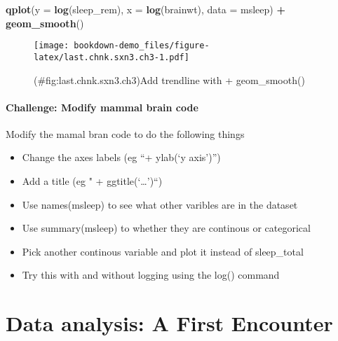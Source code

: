\documentclass[]{book}
\newenvironment{Shaded}{\begin{snugshade}}{\end{snugshade}}
\newcommand{\KeywordTok}[1]{\textcolor[rgb]{0.13,0.29,0.53}{\textbf{#1}}}
\newcommand{\DataTypeTok}[1]{\textcolor[rgb]{0.13,0.29,0.53}{#1}}
\newcommand{\StringTok}[1]{\textcolor[rgb]{0.31,0.60,0.02}{#1}}
\newcommand{\OperatorTok}[1]{\textcolor[rgb]{0.81,0.36,0.00}{\textbf{#1}}}
\newcommand{\NormalTok}[1]{#1}
\providecommand{\tightlist}{%
  \setlength{\itemsep}{0pt}\setlength{\parskip}{0pt}}
\theoremstyle{definition}
\theoremstyle{definition}
\theoremstyle{definition}
\theoremstyle{remark}
\begin{document}
\begin{Shaded}
\begin{Highlighting}[]
\KeywordTok{qplot}\NormalTok{(}\DataTypeTok{y =} \KeywordTok{log}\NormalTok{(sleep_rem),}
      \DataTypeTok{x =} \KeywordTok{log}\NormalTok{(brainwt), }
      \DataTypeTok{data =}\NormalTok{ msleep) }\OperatorTok{+}
\StringTok{  }\KeywordTok{geom_smooth}\NormalTok{()}
\end{Highlighting}
\end{Shaded}

\begin{figure}
\centering
\texttt{[image: bookdown-demo\_files/figure-latex/last.chnk.sxn3.ch3-1.pdf]}
\caption{(\#fig:last.chnk.sxn3.ch3)Add trendline with + geom\_smooth()}
\end{figure}

\subsection{Challenge: Modify mammal brain
code}\label{challenge-modify-mammal-brain-code}

Modify the mamal bran code to do the following things

\begin{itemize}
\tightlist
\item
  Change the axes labels (eg ``+ ylab(`y axis')'')
\item
  Add a title (eg " + ggtitle(`\ldots{}')``)
\item
  Use names(msleep) to see what other varibles are in the dataset
\item
  Use summary(msleep) to whether they are continous or categorical
\item
  Pick another continous variable and plot it instead of sleep\_total
\item
  Try this with and without logging using the log() command
\end{itemize}

\part{Data analysis: A First
Encounter}\label{part-data-analysis-a-first-encounter}

\hypertarget{section-3}{\subsection*{}\label{section-3}}
\end{document}
